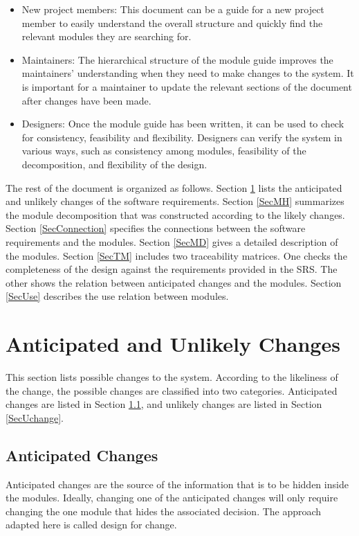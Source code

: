 \documentclass[12pt, titlepage]{article}
\begin{document}
\begin{itemize}
\item New project members: This document can be a guide for a new project member
  to easily understand the overall structure and quickly find the
  relevant modules they are searching for.
\item Maintainers: The hierarchical structure of the module guide improves the
  maintainers' understanding when they need to make changes to the system. It is
  important for a maintainer to update the relevant sections of the document
  after changes have been made.
\item Designers: Once the module guide has been written, it can be used to
  check for consistency, feasibility and flexibility. Designers can verify the
  system in various ways, such as consistency among modules, feasibility of the
  decomposition, and flexibility of the design.
\end{itemize}

The rest of the document is organized as follows. Section
\ref{SecChange} lists the anticipated and unlikely changes of the software
requirements. Section \ref{SecMH} summarizes the module decomposition that
was constructed according to the likely changes. Section \ref{SecConnection}
specifies the connections between the software requirements and the
modules. Section \ref{SecMD} gives a detailed description of the
modules. Section \ref{SecTM} includes two traceability matrices. One checks
the completeness of the design against the requirements provided in the SRS. The
other shows the relation between anticipated changes and the modules. Section
\ref{SecUse} describes the use relation between modules.

\section{Anticipated and Unlikely Changes} \label{SecChange}

This section lists possible changes to the system. According to the likeliness
of the change, the possible changes are classified into two
categories. Anticipated changes are listed in Section \ref{SecAchange}, and
unlikely changes are listed in Section \ref{SecUchange}.

\subsection{Anticipated Changes} \label{SecAchange}

Anticipated changes are the source of the information that is to be hidden
inside the modules. Ideally, changing one of the anticipated changes will only
require changing the one module that hides the associated decision. The approach
adapted here is called design for
change.
\end{document}
